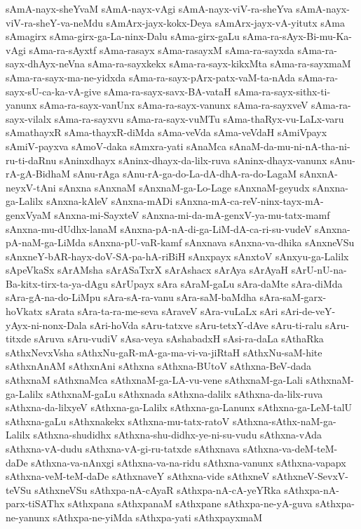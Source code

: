 {sAmA-nayx-sheYvaM
sAmA-nayx-vAgi
sAmA-nayx-viV-ra-sheYva
sAmA-nayx-viV-ra-sheY-va-neMdu
sAmArx-jayx-kokx-Deya
sAmArx-jayx-vA-yitutx
sAma
sAmagirx
sAma-girx-ga-La-ninx-Dalu
sAma-girx-gaLu
sAma-ra-sAyx-Bi-mu-Ka-vAgi
sAma-ra-sAyxtf
sAma-rasayx
sAma-rasayxM
sAma-ra-sayxda
sAma-ra-sayx-dhAyx-neVna
sAma-ra-sayxkekx
sAma-ra-sayx-kikxMta
sAma-ra-sayxmaM
sAma-ra-sayx-ma-ne-yidxda
sAma-ra-sayx-pArx-patx-vaM-ta-nAda
sAma-ra-sayx-sU-ca-ka-vA-give
sAma-ra-sayx-savx-BA-vataH
sAma-ra-sayx-sithx-ti-yanunx
sAma-ra-sayx-vanUnx
sAma-ra-sayx-vanunx
sAma-ra-sayxveV
sAma-ra-sayx-vilalx
sAma-ra-sayxvu
sAma-ra-sayx-vuMTu
sAma-thaRyx-vu-LaLx-varu
sAmathayxR
sAma-thayxR-diMda
sAma-veVda
sAma-veVdaH
sAmiVpayx
sAmiV-payxva
sAmoV-daka
sAmxra-yati
sAnaMca
sAnaM-da-mu-ni-nA-tha-ni-ru-ti-daRnu
sAninxdhayx
sAninx-dhayx-da-lilx-ruva
sAninx-dhayx-vanunx
sAnu-rA-gA-BidhaM
sAnu-rAga
sAnu-rA-ga-do-La-dA-dhA-ra-do-LagaM
sAnxnA-neyxV-tAni
sAnxna
sAnxnaM
sAnxnaM-ga-Lo-Lage
sAnxnaM-geyudx
sAnxna-ga-Lalilx
sAnxna-kAleV
sAnxna-mADi
sAnxna-mA-ca-reV-ninx-tayx-mA-genxVyaM
sAnxna-mi-SayxteV
sAnxna-mi-da-mA-genxV-ya-mu-tatx-mamf
sAnxna-mu-dUdhx-lanaM
sAnxna-pA-nA-di-ga-LiM-dA-ca-ri-su-vudeV
sAnxna-pA-naM-ga-LiMda
sAnxna-pU-vaR-kamf
sAnxnava
sAnxna-va-dhika
sAnxneVSu
sAnxneY-bAR-hayx-doV-SA-pa-hA-riBiH
sAnxpayx
sAnxtoV
sAnxyu-ga-Lalilx
sApeVkaSx
sArAMsha
sArASaTxrX
sArAshacx
sArAya
sArAyaH
sArU-nU-na-Ba-kitx-tirx-ta-ya-dAgu
sArUpayx
sAra
sAraM-gaLu
sAra-daMte
sAra-diMda
sAra-gA-na-do-LiMpu
sAra-sA-ra-vanu
sAra-saM-baMdha
sAra-saM-garx-hoVkatx
sArata
sAra-ta-ra-me-seva
sAraveV
sAra-vuLaLx
sAri
sAri-de-veY-yAyx-ni-nonx-Dala
sAri-hoVda
sAru-tatxve
sAru-tetxY-dAve
sAru-ti-ralu
sAru-titxde
sAruva
sAru-vudiV
sAsa-veya
sAshabadxH
sAsi-ra-daLa
sAthaRka
sAthxNevxVsha
sAthxNu-gaR-mA-ga-ma-vi-va-jiRtaH
sAthxNu-saM-hite
sAthxnAnAM
sAthxnAni
sAthxna
sAthxna-BUtoV
sAthxna-BeV-dada
sAthxnaM
sAthxnaMca
sAthxnaM-ga-LA-vu-vene
sAthxnaM-ga-Lali
sAthxnaM-ga-Lalilx
sAthxnaM-gaLu
sAthxnada
sAthxna-dalilx
sAthxna-da-lilx-ruva
sAthxna-da-lilxyeV
sAthxna-ga-Lalilx
sAthxna-ga-Lanunx
sAthxna-ga-LeM-talU
sAthxna-gaLu
sAthxnakekx
sAthxna-mu-tatx-ratoV
sAthxna-sAthx-naM-ga-Lalilx
sAthxna-shudidhx
sAthxna-shu-didhx-ye-ni-su-vudu
sAthxna-vAda
sAthxna-vA-dudu
sAthxna-vA-gi-ru-tatxde
sAthxnava
sAthxna-va-deM-teM-daDe
sAthxna-va-nAnxgi
sAthxna-va-na-ridu
sAthxna-vanunx
sAthxna-vapapx
sAthxna-veM-teM-daDe
sAthxnaveY
sAthxna-vide
sAthxneV
sAthxneV-SevxV-teVSu
sAthxneVSu
sAthxpa-nA-cAyaR
sAthxpa-nA-cA-yeYRka
sAthxpa-nA-parx-tiSAThx
sAthxpana
sAthxpanaM
sAthxpane
sAthxpa-ne-yA-guva
sAthxpa-ne-yanunx
sAthxpa-ne-yiMda
sAthxpa-yati
sAthxpayxmaM
}

